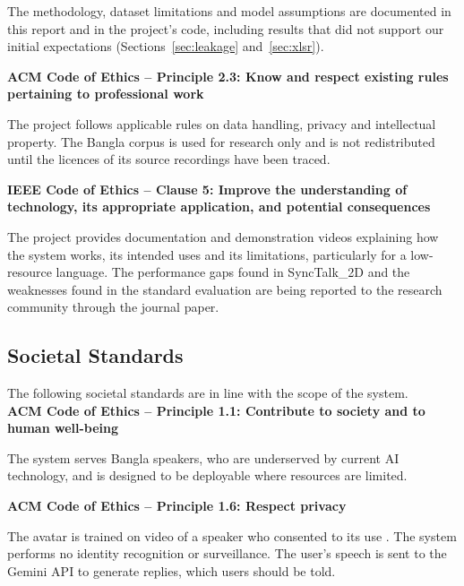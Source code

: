 \noindent
The methodology, dataset limitations and model assumptions are documented in this report and in the project's code, including results that did not support our initial expectations (Sections~\ref{sec:leakage} and~\ref{sec:xlsr}).

\vspace{0.5cm}


\textbf{ACM Code of Ethics -- Principle 2.3: Know and respect existing rules pertaining to professional work}

\noindent
The project follows applicable rules on data handling, privacy and intellectual property. The Bangla corpus is used for research only and is not redistributed until the licences of its source recordings have been traced.

\vspace{0.5cm}


\textbf{IEEE Code of Ethics -- Clause 5: Improve the understanding of technology, its appropriate application, and potential consequences}

\noindent
The project provides documentation and demonstration videos explaining how the system works, its intended uses and its limitations, particularly for a low-resource language. The performance gaps found in SyncTalk\_2D and the weaknesses found in the standard evaluation are being reported to the research community through the journal paper.


\subsection{Societal Standards}

The following societal standards are in line with the scope of the system.\\


\textbf{ACM Code of Ethics -- Principle 1.1: Contribute to society and to human well-being}

\noindent
The system serves Bangla speakers, who are underserved by current AI technology, and is designed to be deployable where resources are limited.

\vspace{0.5cm}


\textbf{ACM Code of Ethics -- Principle 1.6: Respect privacy}

\noindent
The avatar is trained on video of a speaker who consented to its use . The system performs no identity recognition or surveillance. The user's speech is sent to the Gemini API to generate replies, which users should be told.

